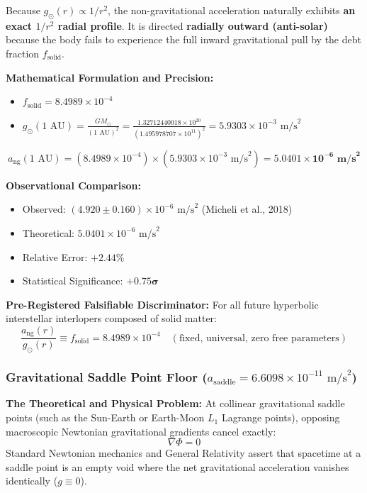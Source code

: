 \documentclass[11pt,a4paper]{article}
\begin{document}
Because $g_\odot(r) \propto 1/r^2$, the non-gravitational acceleration naturally exhibits \textbf{an exact $1/r^2$ radial profile}. It is directed \textbf{radially outward (anti-solar)} because the body fails to experience the full inward gravitational pull by the debt fraction $f_{\text{solid}}$.

\textbf{Mathematical Formulation and Precision:}  
\begin{itemize}
    \item $f_{\text{solid}} = 8.4989 \times 10^{-4}$
    \item $g_\odot(1\text{ AU}) = \frac{GM_\odot}{(1\text{ AU})^2} = \frac{1.32712440018 \times 10^{20}}{(1.495978707 \times 10^{11})^2} = 5.9303 \times 10^{-3}\text{ m/s}^2$
\end{itemize}
\begin{equation}
a_{\text{ng}}(1\text{ AU}) = (8.4989 \times 10^{-4}) \times (5.9303 \times 10^{-3}\text{ m/s}^2) = \mathbf{5.0401 \times 10^{-6}\text{ m/s}^2}
\end{equation}

\textbf{Observational Comparison:}  
\begin{itemize}
    \item Observed: $(4.920 \pm 0.160) \times 10^{-6}\text{ m/s}^2$ (Micheli et al., 2018)
    \item Theoretical: $5.0401 \times 10^{-6}\text{ m/s}^2$
    \item Relative Error: $+2.44\%$
    \item Statistical Significance: $\mathbf{+0.75\sigma}$
\end{itemize}

\textbf{Pre-Registered Falsifiable Discriminator:}  
For all future hyperbolic interstellar interlopers composed of solid matter:
\begin{equation}
\frac{a_{\text{ng}}(r)}{g_\odot(r)} \equiv f_{\text{solid}} = 8.4989 \times 10^{-4} \quad (\text{fixed, universal, zero free parameters})
\end{equation}

\subsubsection{Gravitational Saddle Point Floor (\texorpdfstring{$a_{\text{saddle}} = 6.6098 \times 10^{-11}\text{ m/s}^2$}{asaddle = 6.61e-11 m/s\textasciicircum 2})}
\label{subsubsec:saddle_point_floor}

\textbf{The Theoretical and Physical Problem:}  
At collinear gravitational saddle points (such as the Sun-Earth or Earth-Moon $L_1$ Lagrange points), opposing macroscopic Newtonian gravitational gradients cancel exactly:
\begin{equation}
\nabla\Phi = 0
\end{equation}
Standard Newtonian mechanics and General Relativity assert that spacetime at a saddle point is an empty void where the net gravitational acceleration vanishes identically ($g \equiv 0$).
\end{document}

